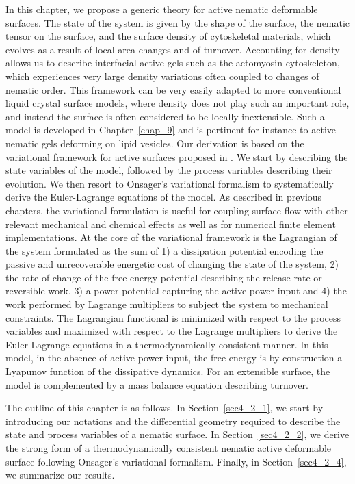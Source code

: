 In this chapter, we propose a generic theory for active nematic deformable surfaces. The state of the system is given by the shape of the surface, the nematic tensor on the surface, and the surface density of cytoskeletal materials, which evolves as a result of local area changes and of turnover. Accounting for density allows us to describe interfacial active gels such as the actomyosin cytoskeleton, which experiences very large density variations often coupled to changes of nematic order. This framework can be very easily adapted to more conventional liquid crystal surface models, where density does not play such an important role, and instead the surface is often considered to be locally inextensible. Such a model is developed in Chapter~\ref{chap_9} and is pertinent for instance to active nematic gels deforming on lipid vesicles. Our derivation is based on the variational framework for active surfaces proposed in \cite{torres2019}. We start by describing the state variables of the model, followed by the process variables describing their evolution. We then resort to Onsager's variational formalism to systematically derive the Euler-Lagrange equations of the model. As described in previous chapters, the variational formulation is useful for coupling surface flow with other relevant mechanical and chemical effects as well as for numerical finite element implementations. At the core of the variational framework is the Lagrangian of the system formulated as the sum of  1) a dissipation potential encoding the passive and unrecoverable energetic cost of changing the state of the system, 2) the rate-of-change of the free-energy potential describing the release rate or reversible work, 3) a power potential capturing the active power input and 4) the work performed by Lagrange multipliers to subject the system to mechanical constraints. The Lagrangian functional is minimized with respect to the process variables and maximized with respect to the Lagrange multipliers to derive the  Euler-Lagrange equations in a thermodynamically consistent manner. In this model, in the absence of active power input, the free-energy is by construction a Lyapunov function of the dissipative dynamics.  For an extensible surface, the model is complemented by a mass balance equation describing turnover.  

The outline of this chapter is as follows. In Section~\ref{sec4_2_1}, we start by introducing our notations and the differential geometry required to describe the state and process variables of a nematic surface. In Section~\ref{sec4_2_2}, we derive the  strong form of a thermodynamically consistent nematic active deformable surface following Onsager's variational formalism. Finally, in Section~\ref{sec4_2_4}, we summarize our results.

